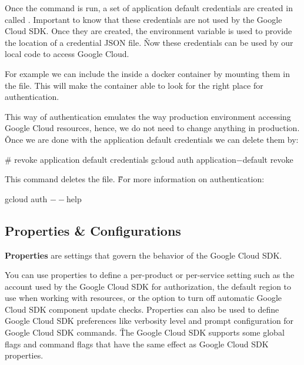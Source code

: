 Once the command is run, a set of application default credentials are created in 
called . Important to know that these credentials are not used by the
Google Cloud SDK. Once they are created, the  environment variable is used to
provide the location of a credential JSON file. \v

Now these credentials can be used by our local code to access Google Cloud.

\be
For example we can include the  inside a docker container by mounting them
in the  file. This will make the container able to look for the right place for authentication.
\ee

This way of authentication emulates the way production environment accessing Google Cloud resources, hence, we do not
need to change anything in production. \v

Once we are done with the application default credentials we can delete them by:
\begin{bash}
# revoke application default credentials
gcloud auth application$-$default revoke
\end{bash}

This command deletes the  file. \v

For more information on authentication:
\begin{bash}
gcloud auth $--$help
\end{bash}

\subsection{Properties \& Configurations}

\bd[Properties]
\textbf{Properties} are settings that govern the behavior of the Google Cloud SDK\@.
\ed

You can use properties to define a per-product or per-service setting such as the account used by the Google Cloud SDK
for authorization, the default region to use when working with resources, or the option to turn off automatic Google
Cloud SDK component update checks. Properties can also be used to define Google Cloud SDK preferences like verbosity
level and prompt configuration for Google Cloud SDK commands. \v

The Google Cloud SDK supports some global flags and command flags that have the same effect as Google Cloud SDK
properties.

